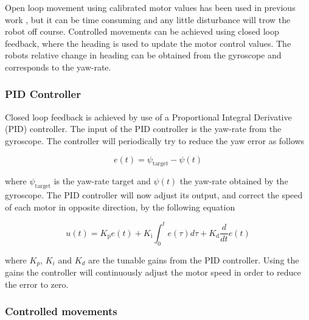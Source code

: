 Open loop movement using calibrated motor values has been used in previous work \cite{legoc_uist_2016}, but it can be time consuming and any little disturbance will trow the robot off course.
Controlled movements can be achieved using closed loop feedback, where the heading is used to update the motor control values.
The robots relative change in heading can be obtained from the gyroscope and corresponds to the yaw-rate.

\subsubsection{PID Controller}


Closed loop feedback is achieved by use of a Proportional Integral Derivative (PID) controller.
The input of the PID controller is the yaw-rate from the gyroscope.
The controller will periodically try to reduce the yaw error as follows

\begin{equation}
	e(t) = \psi_{\text{target}} - \psi(t)
\end{equation}

\noindent
where $\psi_{\text{target}}$ is the yaw-rate target and $\psi(t)$ the yaw-rate obtained by the gyroscope.
The PID controller will now adjust its output, and correct the speed of each motor in opposite direction, by the following equation

\begin{equation}
u(t) = K_{\text{p}}e(t) + K_{\text{i}} \int_{0}^{t}e(\tau)d\tau + K_{\text{d}}\frac{d}{dt}e(t)
\end{equation}

\noindent
where $K_{p}$, $K_{i}$ and $K_{d}$ are the tunable gains from the PID controller.
Using the gains the controller will continuously adjust the motor speed in order to reduce the error to zero.

\subsubsection{Controlled movements}

